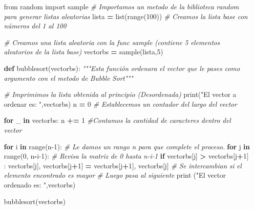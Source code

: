 \documentclass[
]{article}
\newenvironment{Shaded}{\begin{snugshade}}{\end{snugshade}}
\newcommand{\BuiltInTok}[1]{#1}
\newcommand{\CommentTok}[1]{\textcolor[rgb]{0.56,0.35,0.01}{\textit{#1}}}
\newcommand{\ControlFlowTok}[1]{\textcolor[rgb]{0.13,0.29,0.53}{\textbf{#1}}}
\newcommand{\DecValTok}[1]{\textcolor[rgb]{0.00,0.00,0.81}{#1}}
\newcommand{\ImportTok}[1]{#1}
\newcommand{\KeywordTok}[1]{\textcolor[rgb]{0.13,0.29,0.53}{\textbf{#1}}}
\newcommand{\NormalTok}[1]{#1}
\newcommand{\OperatorTok}[1]{\textcolor[rgb]{0.81,0.36,0.00}{\textbf{#1}}}
\newcommand{\StringTok}[1]{\textcolor[rgb]{0.31,0.60,0.02}{#1}}
\begin{document}
\begin{Shaded}
\begin{Highlighting}[]
\ImportTok{from}\NormalTok{ random }\ImportTok{import}\NormalTok{ sample }\CommentTok{# Importamos un metodo de la biblioteca random para generar listas aleatorias}
\NormalTok{lista }\OperatorTok{=} \BuiltInTok{list}\NormalTok{(}\BuiltInTok{range}\NormalTok{(}\DecValTok{100}\NormalTok{)) }\CommentTok{# Creamos la lista base con números del 1 al 100}

\CommentTok{# Creamos una lista aleatoria con la func sample (contiene 5 elementos aleatorios de la lista base)}
\NormalTok{vectorbs }\OperatorTok{=}\NormalTok{ sample(lista,}\DecValTok{5}\NormalTok{) }


\KeywordTok{def}\NormalTok{ bubblesort(vectorbs):}
    \CommentTok{"""Esta función ordenara el vector que le pases como argumento con el metodo de Bubble Sort"""}
    
    \CommentTok{# Imprimimos la lista obtenida al principio (Desordenada)}
    \BuiltInTok{print}\NormalTok{(}\StringTok{"El vector a ordenar es: "}\NormalTok{,vectorbs)}
\NormalTok{    n }\OperatorTok{=} \DecValTok{0} \CommentTok{# Establecemos un contador del largo del vector}
    
    \ControlFlowTok{for}\NormalTok{ _ }\KeywordTok{in}\NormalTok{ vectorbs:}
\NormalTok{        n }\OperatorTok{+=} \DecValTok{1} \CommentTok{#Contamos la cantidad de caracteres dentro del vector}
    
    \ControlFlowTok{for}\NormalTok{ i }\KeywordTok{in} \BuiltInTok{range}\NormalTok{(n}\DecValTok{-1}\NormalTok{): }
    \CommentTok{# Le damos un rango n para que complete el proceso. }
        \ControlFlowTok{for}\NormalTok{ j }\KeywordTok{in} \BuiltInTok{range}\NormalTok{(}\DecValTok{0}\NormalTok{, n}\OperatorTok{-}\NormalTok{i}\DecValTok{-1}\NormalTok{): }
            \CommentTok{# Revisa la matriz de 0 hasta n-i-1}
            \ControlFlowTok{if}\NormalTok{ vectorbs[j] }\OperatorTok{>}\NormalTok{ vectorbs[j}\OperatorTok{+}\DecValTok{1}\NormalTok{] :}
\NormalTok{                vectorbs[j], vectorbs[j}\OperatorTok{+}\DecValTok{1}\NormalTok{] }\OperatorTok{=}\NormalTok{ vectorbs[j}\OperatorTok{+}\DecValTok{1}\NormalTok{], vectorbs[j]}
            \CommentTok{# Se intercambian si el elemento encontrado es mayor }
            \CommentTok{# Luego pasa al siguiente}
    \BuiltInTok{print}\NormalTok{ (}\StringTok{"El vector ordenado es: "}\NormalTok{,vectorbs)}

\NormalTok{bubblesort(vectorbs)}
\end{Highlighting}
\end{Shaded}
\end{document}
